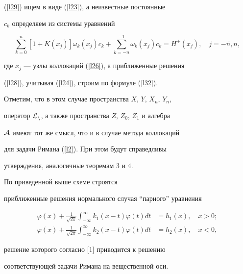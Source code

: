(\ref{l29}) ищем в виде (\ref{l23}), а неизвестные постоянные


$c_k$ определяем из системы уравнений


$$


\sum\limits_{k=0}^n


[1+K(x_j)]\omega_k(x_j)c_k+\sum\limits_{k=-n}^{-1}


\omega_k(x_j)c_k=H^+(x_j), \quad j=\overline{-n,n},


$$


где $x_j$ --- узлы коллокаций (\ref{l26}), а приближенные решения


(\ref{l28}), учитывая (\ref{l24}), строим по формуле (\ref{l32}).





Отметим, что в этом случае пространства $X$,  $Y$, $X_n$,  $Y_n$,


оператор $\cal L_n$, а также пространства $Z$, $Z_0$, $Z_1$ и алгебра


${\cal A}$ имеют тот же смысл, что и в случае метода коллокаций


для задачи Римана (\ref{l2}). При этом будут справедливы


утверждения, аналогичные теоремам 3 и 4.








\begin{note}


По приведенной выше схеме строятся


приближенные решения нормального случая ``парного'' уравнения


\begin{align*}


\varphi(x)+\frac{1}{{\displaystyle\sqrt{2\pi}}}


{\displaystyle\int_{-\infty}^\infty}


k_1(x-t)\varphi(t)dt &= h_1(x), \quad x > 0; \\


\varphi(x)+\frac{1}{{\displaystyle\sqrt{2\pi}}}


{\displaystyle\int_{-\infty}^\infty}


k_2(x-t)\varphi(t)dt &= h_2(x), \quad x < 0,


\end{align*}


решение которого согласно [1] приводится к решению


соответствующей задачи Римана на вещественной оси.


\end{note}








